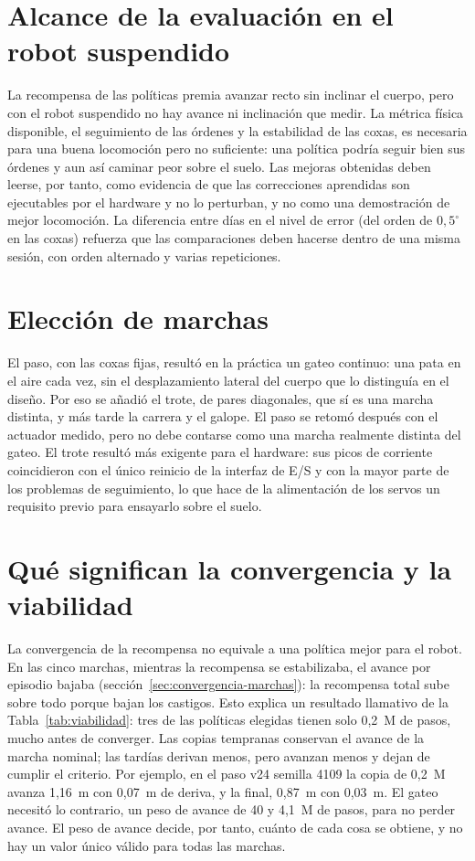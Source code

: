 \section{Alcance de la evaluación en el robot suspendido}

La recompensa de las políticas premia avanzar recto sin inclinar el cuerpo,
pero con el robot suspendido no hay avance ni inclinación que medir. La métrica
física disponible, el seguimiento de las órdenes y la estabilidad de las coxas,
es necesaria para una buena locomoción pero no suficiente: una política podría
seguir bien sus órdenes y aun así caminar peor sobre el suelo. Las mejoras
obtenidas deben leerse, por tanto, como evidencia de que las correcciones
aprendidas son ejecutables por el hardware y no lo perturban, y no como una
demostración de mejor locomoción. La diferencia entre días en el nivel de error
(del orden de $0{,}5^\circ$ en las coxas) refuerza que las comparaciones deben
hacerse dentro de una misma sesión, con orden alternado y varias repeticiones.

\section{Elección de marchas}\label{sec:eleccion-marchas}

El paso, con las coxas fijas, resultó en la práctica un gateo continuo: una pata
en el aire cada vez, sin el desplazamiento lateral del cuerpo que lo distinguía
en el diseño. Por eso se añadió el trote, de pares diagonales, que sí es
una marcha distinta, y más tarde la carrera y el galope. El paso se retomó después con el
actuador medido, pero no debe contarse como una marcha realmente distinta del gateo. El trote resultó más exigente para el hardware: sus picos
de corriente coincidieron con el único reinicio de la interfaz de E/S y con la
mayor parte de los problemas de seguimiento, lo que hace de la alimentación de
los servos un requisito previo para ensayarlo sobre el suelo.

\section{Qué significan la convergencia y la viabilidad}

La convergencia de la recompensa no equivale a una política mejor para el robot. En
las cinco marchas, mientras la recompensa se estabilizaba, el avance por episodio
bajaba (sección~\ref{sec:convergencia-marchas}): la recompensa total sube sobre todo
porque bajan los castigos. Esto explica un resultado llamativo de la
Tabla~\ref{tab:viabilidad}: tres de las políticas elegidas tienen solo 0,2~M de pasos,
mucho antes de converger. Las copias tempranas conservan el avance de la marcha nominal;
las tardías derivan menos, pero avanzan menos y dejan de cumplir el criterio. Por
ejemplo, en el paso v24 semilla 4109 la copia de 0,2~M avanza 1,16~m con 0,07~m de
deriva, y la final, 0,87~m con 0,03~m. El gateo necesitó lo contrario, un peso de avance de 40 y 4,1~M de pasos,
para no perder avance. El peso de avance decide, por tanto, cuánto de cada cosa se
obtiene, y no hay un valor único válido para todas las marchas.

